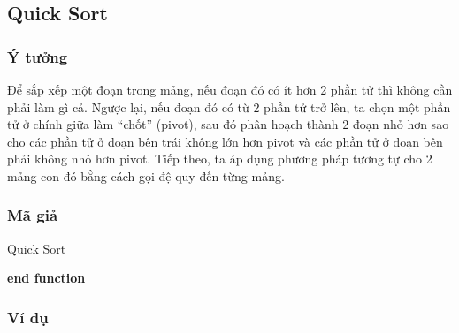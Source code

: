 \subsection{Quick Sort}

\subsubsection{Ý tưởng}

Để sắp xếp một đoạn trong mảng, nếu đoạn đó có ít hơn 2 phần tử thì không cần phải làm gì cả. Ngược lại, nếu đoạn đó có từ 2 phần tử trở lên, ta chọn một phần tử ở chính giữa làm “chốt” (pivot), sau đó phân hoạch thành 2 đoạn nhỏ hơn sao cho các phần tử ở đoạn bên trái không lớn hơn pivot và các phần tử ở đoạn bên phải không nhỏ hơn pivot. Tiếp theo, ta áp dụng phương pháp tương tự cho 2 mảng con đó bằng cách gọi đệ quy đến từng mảng.

\subsubsection{Mã giả}

\begin{algorithm}[H]
\caption{Quick Sort}
\label{quick-sort}

\textbf{end function}
\end{algorithm}

\subsubsection{Ví dụ}

